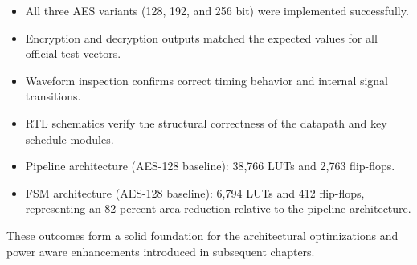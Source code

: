\begin{itemize}
    \item All three AES variants (128, 192, and 256 bit) were implemented successfully.
    \item Encryption and decryption outputs matched the expected values for all official test vectors.
    \item Waveform inspection confirms correct timing behavior and internal signal transitions.
    \item RTL schematics verify the structural correctness of the datapath and key schedule modules.
    \item Pipeline architecture (AES-128 baseline): 38,766 LUTs and 2,763 flip-flops.
    \item FSM architecture (AES-128 baseline): 6,794 LUTs and 412 flip-flops, representing
          an 82 percent area reduction relative to the pipeline architecture.
\end{itemize}

These outcomes form a solid foundation for the architectural optimizations and power aware
enhancements introduced in subsequent chapters.
